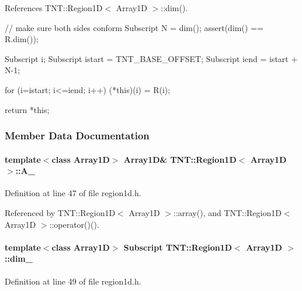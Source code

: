 References TNT::Region1D$<$ Array1D $>$::dim().




\begin{DoxyCode}
        {
            // make sure both sides conform
            Subscript N = dim();
            assert(dim() == R.dim());

            Subscript i;
            Subscript istart = TNT_BASE_OFFSET;
            Subscript iend = istart + N-1;

            for (i=istart; i<=iend; i++)
                (*this)(i) = R(i);

            return *this;

        }
\end{DoxyCode}




\subsubsection{Member Data Documentation}
\paragraph[{A\_\-}]{\setlength{\rightskip}{0pt plus 5cm}template$<$class Array1D$>$ Array1D\& {\bf TNT::Region1D}$<$ Array1D $>$::{\bf A\_\-}}\hfill\label{class_t_n_t_1_1_region1_d_a4c4daf08ea2797496584ea6d2cd7c18e}


Definition at line 47 of file region1d.h.



Referenced by TNT::Region1D$<$ Array1D $>$::array(), and TNT::Region1D$<$ Array1D $>$::operator()().

\paragraph[{dim\_\-}]{\setlength{\rightskip}{0pt plus 5cm}template$<$class Array1D$>$ {\bf Subscript} {\bf TNT::Region1D}$<$ Array1D $>$::{\bf dim\_\-}}\hfill\label{class_t_n_t_1_1_region1_d_a83591fa19807181bc1433f8d03ec0d3a}


Definition at line 49 of file region1d.h.



